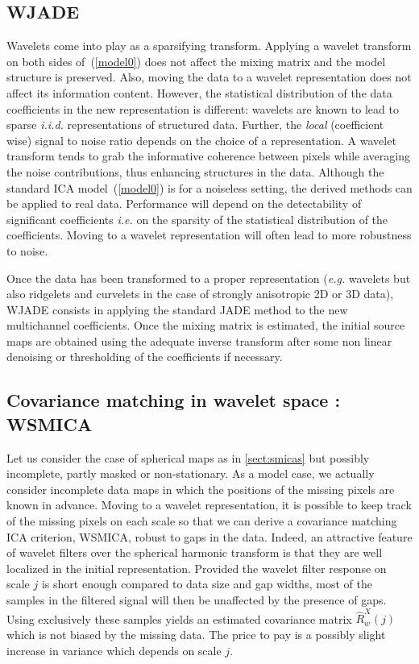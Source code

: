 \subsection{WJADE}\label{sec:wjade}

Wavelets come into play as a sparsifying transform. Applying a wavelet transform on both sides of~(\ref{model0}) does not affect the 
mixing matrix and the model structure is preserved. Also, moving the data to a wavelet representation does not affect its information 
content. However, the statistical distribution of the data coefficients in the new representation is different: wavelets are known to 
lead to sparse \emph{i.i.d.} representations of structured data. Further, the \emph{local} (coefficient wise) signal to noise ratio 
depends on the choice of a representation. A wavelet transform tends to grab the informative coherence between pixels while averaging 
the noise contributions, thus enhancing structures in the data. Although the standard ICA model~(\ref{model0}) is for a noiseless setting, 
the derived methods can be applied to real data. Performance will depend on the detectability of significant coefficients \emph{i.e.} on 
the sparsity of the statistical distribution of the coefficients. Moving to a wavelet representation will often lead to more robustness to noise.    

Once the data has been transformed to a proper representation (\emph{e.g.} wavelets but also ridgelets and curvelets in the case of strongly 
anisotropic 2D or 3D data), WJADE consists in applying the standard JADE method to the new multichannel coefficients. Once the mixing matrix 
is estimated, the initial source maps are obtained using the adequate inverse transform after some non linear denoising or thresholding of 
the coefficients if necessary.

\subsection{Covariance matching in wavelet space : WSMICA}\label{sect:wsmica}

Let us consider the case of spherical maps as in \ref{sect:smicas} but possibly incomplete, partly masked or non-stationary. As a model case, 
we actually consider incomplete data maps in which the positions of the missing pixels are known in advance. Moving to a wavelet representation, 
it is possible to keep track of the missing pixels on each scale so that we can derive a covariance matching ICA criterion, WSMICA, robust to 
gaps in the data. Indeed, an attractive feature of wavelet filters over the spherical harmonic transform is that they are well localized in the 
initial representation. Provided the wavelet filter response on scale $j$ is short enough compared to data size and gap widths, most of the 
samples in the filtered signal will then be unaffected by the presence of gaps. Using exclusively these samples yields an estimated covariance 
matrix $\widehat{R}_w^X(j)$ which is not biased by the missing data. The price to pay is a possibly slight increase in variance which depends on scale $j$.

